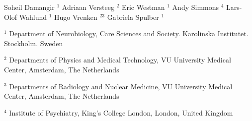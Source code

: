 Soheil Damangir $^1$
Adriaan Versteeg $^2$
Eric Westman $^1$ 
Andy Simmons $^4$
Lars-Olof Wahlund $^1$
Hugo Vrenken $^{23}$
Gabriela Spulber $^1$

$^1$ Department of Neurobiology, Care Sciences and Society. Karolinska Institutet. Stockholm. Sweden

$^2$ Departments of Physics and Medical Technology, VU University Medical Center, Amsterdam, The Netherlands

$^3$ Departments of Radiology and Nuclear Medicine, VU University Medical Center, Amsterdam, The Netherlands

$^4$ Institute of Psychiatry, King's College London, London, United Kingdom
  
  
  
  